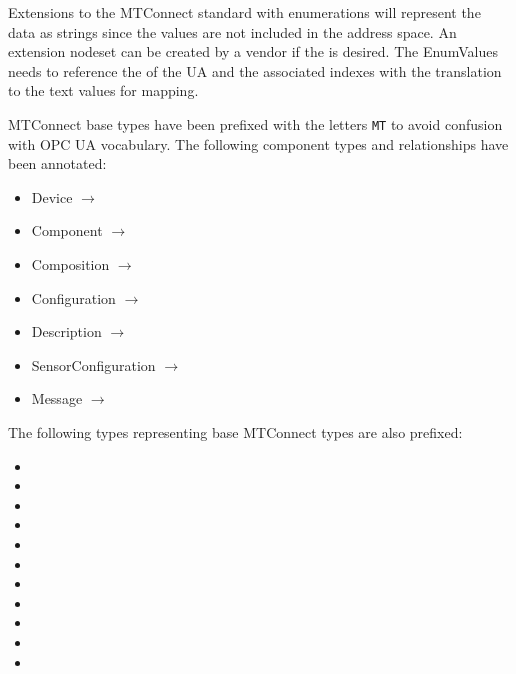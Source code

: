 Extensions to the MTConnect standard with enumerations will represent the data as strings since the values are not included in the address space. An extension nodeset can be created by a vendor if the  is desired. The EnumValues needs to reference the  of the UA  and the associated indexes with the translation to the text values for mapping.

MTConnect base types have been prefixed with the letters \texttt{MT} to avoid confusion with OPC UA vocabulary. The following component types and relationships have been annotated:

\begin{itemize}
  \setlength\itemsep{0em}
  \item Device $\rightarrow$ 
  \item Component $\rightarrow$  
  \item Composition $\rightarrow$ 
  \item Configuration $\rightarrow$ 
  \item Description $\rightarrow$ 
  \item SensorConfiguration $\rightarrow$ 
  \item Message $\rightarrow$ 
\end{itemize}

The following types representing base MTConnect types are also prefixed:

\begin{itemize}
  \setlength\itemsep{0em}
  \item {}
  \item {}
  \item {}
  \item {}
  \item {}
  \item {}
  \item {}
  \item {}
  \item {}
  \item {}
  \item {}
\end{itemize}

